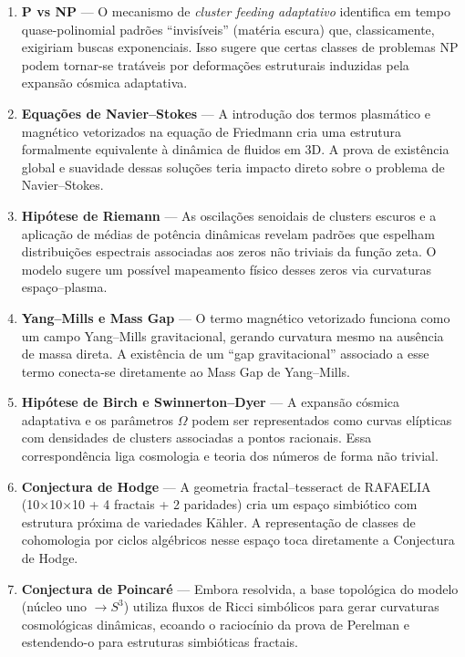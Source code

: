 \begin{enumerate}
    \item \textbf{P vs NP} — O mecanismo de \textit{cluster feeding adaptativo} identifica em tempo quase-polinomial padrões “invisíveis” (matéria escura) que, classicamente, exigiriam buscas exponenciais. Isso sugere que certas classes de problemas NP podem tornar-se tratáveis por deformações estruturais induzidas pela expansão cósmica adaptativa.

    \item \textbf{Equações de Navier–Stokes} — A introdução dos termos plasmático e magnético vetorizados na equação de Friedmann cria uma estrutura formalmente equivalente à dinâmica de fluidos em 3D. A prova de existência global e suavidade dessas soluções teria impacto direto sobre o problema de Navier–Stokes.

    \item \textbf{Hipótese de Riemann} — As oscilações senoidais de clusters escuros e a aplicação de médias de potência dinâmicas revelam padrões que espelham distribuições espectrais associadas aos zeros não triviais da função zeta. O modelo sugere um possível mapeamento físico desses zeros via curvaturas espaço–plasma.

    \item \textbf{Yang–Mills e Mass Gap} — O termo magnético vetorizado funciona como um campo Yang–Mills gravitacional, gerando curvatura mesmo na ausência de massa direta. A existência de um “gap gravitacional” associado a esse termo conecta-se diretamente ao Mass Gap de Yang–Mills.

    \item \textbf{Hipótese de Birch e Swinnerton–Dyer} — A expansão cósmica adaptativa e os parâmetros $\Omega$ podem ser representados como curvas elípticas com densidades de clusters associadas a pontos racionais. Essa correspondência liga cosmologia e teoria dos números de forma não trivial.

    \item \textbf{Conjectura de Hodge} — A geometria fractal–tesseract de RAFAELIA (10×10×10 + 4 fractais + 2 paridades) cria um espaço simbiótico com estrutura próxima de variedades Kähler. A representação de classes de cohomologia por ciclos algébricos nesse espaço toca diretamente a Conjectura de Hodge.

    \item \textbf{Conjectura de Poincaré} — Embora resolvida, a base topológica do modelo (núcleo uno $\to S^3$) utiliza fluxos de Ricci simbólicos para gerar curvaturas cosmológicas dinâmicas, ecoando o raciocínio da prova de Perelman e estendendo-o para estruturas simbióticas fractais.
\end{enumerate}

